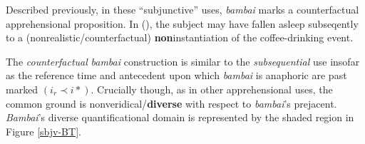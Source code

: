 Described previously, in these ``subjunctive'' uses, \textit{bambai} marks a counterfactual apprehensional proposition. In (), the subject may have fallen asleep subseqently to a (nonrealistic\slash counterfactual) \textbf{non}instantiation of the coffee-drinking event.

The \textit{counterfactual} \textit{bambai} construction is similar to the \textit{subsequential} use insofar as the reference time and antecedent upon which \textit{bambai} is anaphoric are past marked $ (i_r\prec i*) $. Crucially though, as in other apprehensional uses, the common ground is nonveridical/\textbf{diverse} with respect to \textit{bambai}'s prejacent. \textit{Bambai}'s diverse quantificational domain is represented by the shaded region in Figure \ref{sbjv-BT}.





%
%








